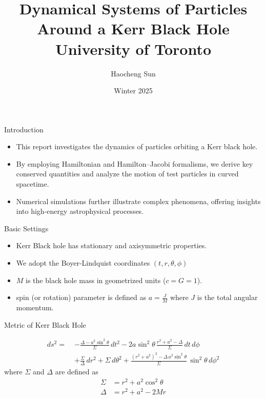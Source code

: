 \documentclass{beamer}
\title[Dynamical Systems of Particles]{Dynamical Systems of Particles\\ Around a Kerr Black Hole\\
{\small University of Toronto}}
\author{Haocheng Sun}
\date{Winter 2025}
\begin{document}
\begin{frame}
  \titlepage
\end{frame}

\begin{frame}{Introduction}
\begin{itemize}
    \item This report investigates the dynamics of particles orbiting a Kerr black hole.
    \item By employing Hamiltonian and Hamilton–Jacobi formalisms, we derive key conserved quantities and analyze the motion of test particles in curved spacetime.
    \item Numerical simulations further illustrate complex phenomena, offering insights into high-energy astrophysical processes.
\end{itemize}
\end{frame}


\begin{frame}{Basic Settings}
\begin{itemize}
    \item Kerr Black hole has stationary and axisymmetric properties.
    \item We adopt the Boyer-Lindquist coordinates \((t, r, \theta, \phi)\)
    \item $M$ is the black hole mass in geometrized units ($c = G = 1$).
    \item spin (or rotation) parameter is defined as $a = \frac{J}{M}$
where $J$ is the total angular momentum.
\end{itemize}
\end{frame}






\begin{frame}{Metric of Kerr Black Hole}

\begin{align}
    ds^2 = \;& -\frac{\Delta - a^2 \sin^2\theta}{\Sigma} \, dt^2
    - 2 a \sin^2\theta \,\frac{r^2 + a^2 - \Delta}{\Sigma} \, dt \, d\phi \nonumber \\
    & + \frac{\Sigma}{\Delta} \, dr^2+ \Sigma \, d\theta^2
    + \frac{(r^2 + a^2)^2 - \Delta \, a^2 \sin^2\theta}{\Sigma} \, \sin^2\theta \, d\phi^2
\end{align}
where $\Sigma$ and $\Delta$ are defined as
\begin{align}
    \Sigma &= r^2 + a^2 \cos^2\theta\\
    \Delta &= r^2 + a^2 - 2 M r
\end{align}

\end{frame}
\end{document}
